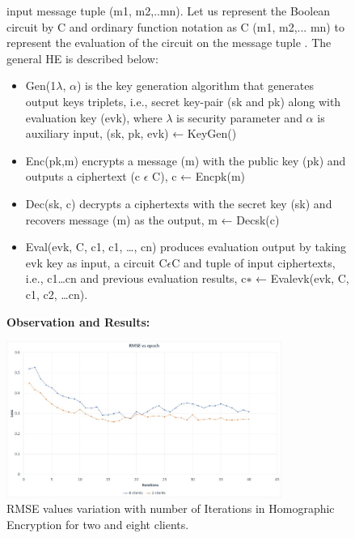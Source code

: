 \documentclass[conference]{IEEEtran}
\begin{document}
\begin{figure}

\vspace{\baselineskip}
 
input message tuple (m1, m2,..mn). Let us represent the Boolean circuit by C and ordinary function notation as C (m1, m2,... mn) to represent the evaluation of the circuit on the message tuple . The general HE is described below:

\vspace{\baselineskip}

\begin{itemize}

\item Gen(1$\lambda$, $\alpha$) is the key generation algorithm that generates output keys triplets, i.e., secret key-pair (sk and pk) along with evaluation key (evk), where $\lambda$ is security parameter and $\alpha$ is auxiliary input, (sk, pk, evk) ← KeyGen()

\vspace{\baselineskip}

\item Enc(pk,m) encrypts a message (m) with the public key (pk) and outputs a ciphertext (c $\epsilon$ C), c ← Encpk(m)

\vspace{\baselineskip}

\item Dec(sk, c) decrypts a ciphertexts with the secret key (sk) and recovers message (m) as the output, m ← Decsk(c)

\vspace{\baselineskip}

\item Eval(evk, C, c1, c1, …, cn) produces evaluation output by taking evk key as input, a circuit C$\epsilon$C and tuple of input ciphertexts, i.e., c1…cn and previous evaluation results, c$∗$ ← Evalevk(evk, C, c1, c2, …cn).

\vspace{\baselineskip}

\end{itemize}

\textbf{Observation and Results:}

\vspace{\baselineskip}

\includegraphics[width=90mm,scale=0.7]{RMSE_HE.jpeg}
\caption{ RMSE values variation with number of Iterations in Homographic Encryption for two and eight clients.}

\end{figure}
\end{document}
